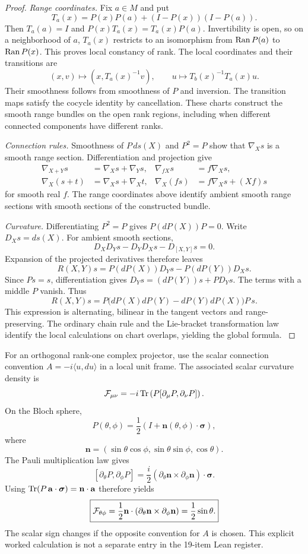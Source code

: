 \begin{proof}\label{core:proof:013}
\textit{Range coordinates.} Fix $a\in M$ and put
\[
T_a(x)=P(x)P(a)+(I-P(x))(I-P(a)).
\]
Then $T_a(a)=I$ and $P(x)T_a(x)=T_a(x)P(a)$. Invertibility is open, so on a neighborhood of $a$, $T_a(x)$ restricts to an isomorphism from $\operatorname{Ran} P(a)$ to $\operatorname{Ran} P(x)$. This proves local constancy of rank. The local coordinates and their transitions are
\[
(x,v)\longmapsto (x,T_a(x)^{-1}v),\qquad
u\longmapsto T_b(x)^{-1}T_a(x)u.
\]
Their smoothness follows from smoothness of $P$ and inversion. The transition maps satisfy the cocycle identity by cancellation. These charts construct the smooth range bundles on the open rank regions, including when different connected components have different ranks.

\textit{Connection rules.} Smoothness of $P\,ds(X)$ and $P^2=P$ show that $\nabla_Xs$ is a smooth range section. Differentiation and projection give
\[
\begin{aligned}
\nabla_{X+Y}s&=\nabla_Xs+\nabla_Ys,&
\nabla_{fX}s&=f\nabla_Xs,\\
\nabla_X(s+t)&=\nabla_Xs+\nabla_Xt,&
\nabla_X(fs)&=f\nabla_Xs+(Xf)s
\end{aligned}
\]
for smooth real $f$. The range coordinates above identify ambient smooth range sections with smooth sections of the constructed bundle.

\textit{Curvature.} Differentiating $P^2=P$ gives $P(dP(X))P=0$. Write $D_Xs=ds(X)$. For ambient smooth sections,
\[
D_XD_Ys-D_YD_Xs-D_{[X,Y]}s=0.
\]
Expansion of the projected derivatives therefore leaves
\[
R(X,Y)s=P(dP(X))D_Ys-P(dP(Y))D_Xs.
\]
Since $Ps=s$, differentiation gives $D_Ys=(dP(Y))s+PD_Ys$. The terms with a middle $P$ vanish. Thus
\[
R(X,Y)s=P\bigl(dP(X)dP(Y)-dP(Y)dP(X)\bigr)P\,s.
\]
This expression is alternating, bilinear in the tangent vectors and range-preserving. The ordinary chain rule and the Lie-bracket transformation law identify the local calculations on chart overlaps, yielding the global formula.
\label{core:proof:013:end}\end{proof}

For an orthogonal rank-one complex projector, use the scalar connection convention $A=-i\langle u,du\rangle$ in a local unit frame. The associated scalar curvature density is
\[
\cF_{\mu\nu}
=-i\Tr\left(P[\partial_\mu P,\partial_\nu P]\right).
\]
On the Bloch sphere,
\[
P(\theta,\phi)
=
\frac12\left(I+\mathbf n(\theta,\phi)\cdot\boldsymbol\sigma\right),
\]
where
\[
\mathbf n=(\sin\theta\cos\phi,\sin\theta\sin\phi,\cos\theta).
\]
The Pauli multiplication law gives
\[
[\partial_\theta P,\partial_\phi P]
=\frac{i}{2}(\partial_\theta\mathbf n\mathbin{\times}\partial_\phi\mathbf n)\cdot\boldsymbol\sigma.
\]
Using $\Tr(P\,\mathbf a\cdot\boldsymbol\sigma)=\mathbf n\cdot\mathbf a$ therefore yields
\[
\boxed{\cF_{\theta\phi}
=\frac12\mathbf n\cdot(\partial_\theta\mathbf n\mathbin{\times}\partial_\phi\mathbf n)
=\frac12\sin\theta.}
\]
The scalar sign changes if the opposite convention for $A$ is chosen. This explicit worked calculation is not a separate entry in the 19-item Lean register.

